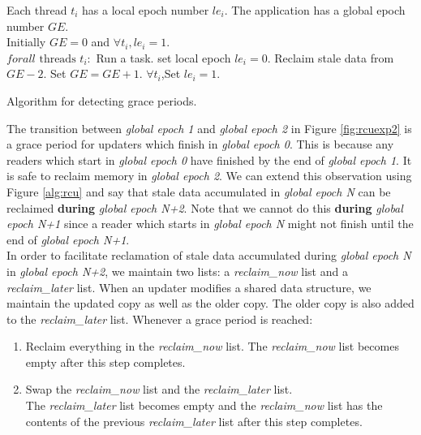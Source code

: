 \documentclass[a4paper]{article}
\begin{document}
\begin{algorithm}[float=tph]
\begin{algorithmic}
{
\STATE Each thread $t_i$ has a local epoch number $le_i$.
\STATE The application has a global epoch number $GE$.\\
\STATE Initially  $GE=0$ and $\forall t_i, le_i=1$. \\
\STATE $forall \mbox{ threads }t_i:$
\STATE Run a task.
\STATE set local epoch  $le_i=0$.
  \STATE Reclaim stale data from $GE-2$.
  \STATE Set $GE=GE+1$.
  \STATE $\forall t_i$,Set $le_i=1$.
\ENDIF
\ENDWHILE
}
\caption{Algorithm for detecting grace periods.}
\label{alg:rcu}
\end{algorithmic}
\end{algorithm}
The transition between \emph{global epoch 1} and \emph{global epoch 2} in Figure \ref{fig:rcuexp2} is a grace period for updaters which finish in \emph{global epoch 0}. This is because any readers which start in \emph{global epoch 0} have finished by the end of \emph{global epoch 1}. It is safe to reclaim memory in \emph{global epoch 2}. We can extend this observation using Figure \ref{alg:rcu} and say that stale data accumulated in \emph{global epoch N} can be reclaimed \textbf{during} \emph{global epoch N+2}. Note that we cannot do this \textbf{during} \emph{global epoch N+1} since a reader which starts in \emph{global epoch N} might not finish until the end of \emph{global epoch N+1}.\\

In order to facilitate reclamation of stale data accumulated during \emph{global epoch N} in \emph{global epoch N+2}, we maintain two lists: a \emph{reclaim\_now} list and a \emph{reclaim\_later} list. When an updater modifies a shared data structure, we maintain the updated copy as well as the older copy. The older copy is also added to the \emph{reclaim\_later} list. Whenever a grace period is reached:
\begin{enumerate}
\item Reclaim everything in the \emph{reclaim\_now} list. The \emph{reclaim\_now} list becomes empty after this step completes.
\item Swap the \emph{reclaim\_now} list and the \emph{reclaim\_later} list.\\
The \emph{reclaim\_later} list becomes empty and the \emph{reclaim\_now} list has the contents of the previous \emph{reclaim\_later} list after this step completes.
\end{enumerate}
\end{document}
